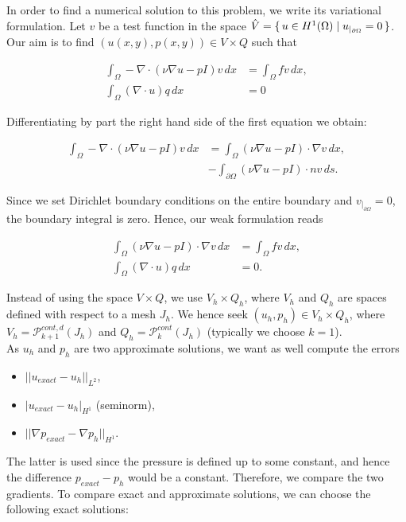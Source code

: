 \documentclass[11pt,a4paper,titlepage]{report}
\begin{document}
In order to find a numerical solution to this problem, we write its variational formulation. Let $v$ be a test function in the space $\hat{V} = \set{u \in H^1(\Omega) | u_{|_{\partial \Omega}} = 0} $. Our aim is to find $(u(x,y),p(x,y)) \in V \times Q$ such that

\begin{align}
\int_\Omega -\nabla \cdot (\nu \nabla u - pI)v \,dx &= \int_\Omega fv \,dx, \\
\int_\Omega (\nabla \cdot u)q \,dx &= 0
\end{align}

Differentiating by part the right hand side of the first equation we obtain:

\begin{align}
\int_\Omega -\nabla \cdot (\nu \nabla u - pI)v \,dx &= \int_\Omega (\nu \nabla u - pI) \cdot \nabla v \,dx, \\
&- \int_{\partial \Omega} (\nu \nabla u - pI) \cdot n v \,ds.
\end{align}

Since we set Dirichlet boundary conditions on the entire boundary and $v_{|_{\partial \Omega}} = 0$, the boundary integral is zero. Hence, our weak formulation reads

\begin{align}
\int_\Omega (\nu \nabla u - pI) \cdot \nabla v \,dx &= \int_\Omega fv \,dx, \\
\int_\Omega (\nabla \cdot u) q \,dx &= 0.
\end{align}

Instead of using the space $V \times Q$, we use $V_h \times Q_h$, where $V_h$ and $Q_h$ are spaces defined with respect to a mesh $J_h$. We hence seek $(u_h, p_h) \in V_h \times Q_h$, where $V_h = \mathcal{P}^{cont,d}_{k+1} (J_h)$ and $Q_h = \mathcal{P}^{cont}_{k} (J_h)$ (typically we choose $k=1$). \\

As $u_h$ and $p_h$ are two approximate solutions, we want as well compute the errors

\begin{itemize}
\item $|| u_{exact} - u_h ||_{L^2}$,
\item $ | u_{exact} - u_h |_{H^1}$ (seminorm),
\item $|| \nabla p_{exact} - \nabla p_h ||_{H^1} $.
\end{itemize}

The latter is used since the pressure is defined up to some constant, and hence the difference $p_{exact} - p_h$ would be a constant. Therefore, we compare the two gradients.
To compare exact and approximate solutions, we can choose the following exact solutions:
\end{document}

